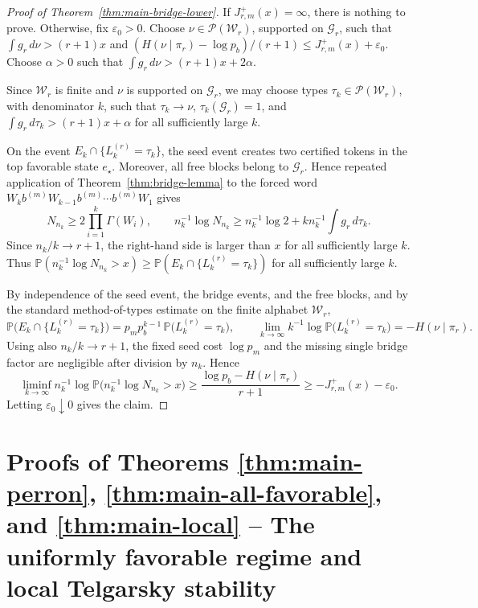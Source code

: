 \documentclass[11pt]{amsart}
\numberwithin{equation}{section}
\theoremstyle{plain}
\theoremstyle{definition}
\theoremstyle{remark}
\begin{document}
\begin{proof}[Proof of Theorem~\ref{thm:main-bridge-lower}]
If \(J_{r,m}^{+}(x)=\infty\), there is nothing to prove. Otherwise, fix
\(\varepsilon_0>0\). Choose \(\nu\in\mathcal P(\mathcal W_r)\), supported on
\(\mathcal G_r\), such that \(\int g_r\,d\nu>(r+1)x\) and
\((H(\nu\mid\pi_r)-\log p_b)/(r+1)\le J_{r,m}^{+}(x)+\varepsilon_0\).
Choose \(\alpha>0\) such that
\(\int g_r\,d\nu>(r+1)x+2\alpha\).

Since \(\mathcal W_r\) is finite and \(\nu\) is supported on \(\mathcal G_r\),
we may choose types \(\tau_k\in\mathcal P(\mathcal W_r)\), with denominator
\(k\), such that \(\tau_k\to\nu\), \(\tau_k(\mathcal G_r)=1\), and
\(\int g_r\,d\tau_k>(r+1)x+\alpha\) for all sufficiently large \(k\).

On the event \(E_k\cap\{L_k^{(r)}=\tau_k\}\), the seed event creates two
certified tokens in the top favorable state \(e_\star\). Moreover, all free
blocks belong to \(\mathcal G_r\). Hence repeated application of
Theorem~\ref{thm:bridge-lemma} to the forced word
\(W_k b^{(m)} W_{k-1} b^{(m)}\cdots b^{(m)}W_1\) gives
\[
N_{n_k}\ge 2\prod_{i=1}^k\Gamma(W_i),
\qquad
n_k^{-1}\log N_{n_k}
\ge n_k^{-1}\log 2+k n_k^{-1}\int g_r\,d\tau_k .
\]
Since \(n_k/k\to r+1\), the right-hand side is larger than \(x\) for all
sufficiently large \(k\). Thus
\(\mathbb P(n_k^{-1}\log N_{n_k}>x)\ge
\mathbb P(E_k\cap\{L_k^{(r)}=\tau_k\})\) for all sufficiently large \(k\).

By independence of the seed event, the bridge events, and the free blocks,
and by the standard method-of-types estimate on the finite alphabet
\(\mathcal W_r\),
\[
\mathbb P\bigl(E_k\cap\{L_k^{(r)}=\tau_k\}\bigr)
=
p_m p_b^{k-1}\,
\mathbb P\bigl(L_k^{(r)}=\tau_k\bigr),
\qquad
\lim_{k\to\infty}
k^{-1}\log \mathbb P\bigl(L_k^{(r)}=\tau_k\bigr)
=
-H(\nu\mid\pi_r).
\]
Using also \(n_k/k\to r+1\), the fixed seed cost \(\log p_m\) and the missing
single bridge factor are negligible after division by \(n_k\). Hence
\[
\liminf_{k\to\infty}
n_k^{-1}\log\mathbb P\bigl(n_k^{-1}\log N_{n_k}>x\bigr)
\ge
\frac{\log p_b-H(\nu\mid\pi_r)}{r+1}
\ge
-J_{r,m}^{+}(x)-\varepsilon_0 .
\]
Letting \(\varepsilon_0\downarrow0\) gives the claim.
\end{proof}




\section{Proofs of  Theorems \ref{thm:main-perron}, \ref{thm:main-all-favorable}, and \ref{thm:main-local} -- 
The uniformly favorable regime and local Telgarsky stability}\label{sec:uniform}
\end{document}
